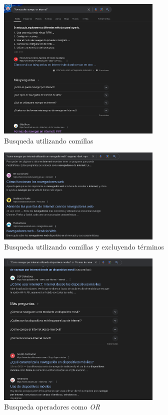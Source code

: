 \documentclass[12pt]{article}
\begin{document}
                \begin{figure}[h!]
                        \centering
                        \includegraphics[width=0.7\textwidth]{img/t1-1.png}
                        \caption{Busqueda utilizando comillas}
                \end{figure}

                \begin{figure}[h!]
                        \centering
                        \includegraphics[width=0.7\textwidth]{img/t1-2.png}
                        \caption{Busqueda utilizando comillas y excluyendo términos}
                \end{figure}

                \newpage
                \begin{figure}[h!]
                        \centering
                        \includegraphics[width=0.7\textwidth]{img/t1-3.png}
                        \caption{Busqueda operadores como \textit{OR}}
                \end{figure}
\end{document}
